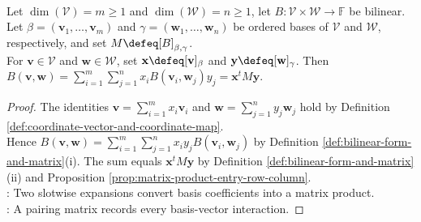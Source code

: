 \begin{proposition} \label{prop:bilinear-coordinate-evaluation} \\
Let $\dim(\mathcal{V})=m\geq1$ and $\dim(\mathcal{W})=n\geq1$, let $B:\mathcal{V}\times\mathcal{W}\to\mathbb{F}$ be bilinear.\\
Let $\beta=(\mathbf{v}_1,\ldots,\mathbf{v}_m)$ and $\gamma=(\mathbf{w}_1,\ldots,\mathbf{w}_n)$ be ordered bases of $\mathcal{V}$ and $\mathcal{W}$, respectively, and set $M\defeq[B]_{\beta,\gamma}$.\\
For $\mathbf{v}\in\mathcal{V}$ and $\mathbf{w}\in\mathcal{W}$, set $\mathbf{x}\defeq[\mathbf{v}]_{\beta}$ and $\mathbf{y}\defeq[\mathbf{w}]_{\gamma}$. Then $B(\mathbf{v},\mathbf{w})=\sum\limits_{i=1}^{m}\sum\limits_{j=1}^{n}x_iB(\mathbf{v}_i,\mathbf{w}_j)y_j=\mathbf{x}^tM\mathbf{y}$.
\begin{proof}
The identities $\mathbf{v}=\sum\limits_{i=1}^{m}x_i\mathbf{v}_i$ and $\mathbf{w}=\sum\limits_{j=1}^{n}y_j\mathbf{w}_j$ hold by Definition \ref{def:coordinate-vector-and-coordinate-map}.\\
Hence $B(\mathbf{v},\mathbf{w})=\sum\limits_{i=1}^{m}\sum\limits_{j=1}^{n}x_iy_jB(\mathbf{v}_i,\mathbf{w}_j)$ by Definition \ref{def:bilinear-form-and-matrix}(i). The sum equals $\mathbf{x}^tM\mathbf{y}$ by Definition \ref{def:bilinear-form-and-matrix}(ii) and Proposition \ref{prop:matrix-product-entry-row-column}.\\
: Two slotwise expansions convert basis coefficients into a matrix product.\\
: A pairing matrix records every basis-vector interaction.
\end{proof}
\end{proposition}

